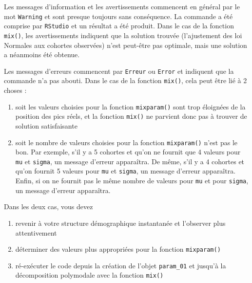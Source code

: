 \documentclass[
  a4paper,
  DIV=11,
  numbers=noendperiod,
  oneside]{scrreprt}
\providecommand{\tightlist}{%
  \setlength{\itemsep}{0pt}\setlength{\parskip}{0pt}}\usepackage{longtable,booktabs,array}
\begin{document}
{} Les messages d'information et les avertissements
commencent en général par le mot \texttt{Warning} et sont presque
toujours sans conséquence. La commande a été comprise par
\texttt{RStudio} et un résultat a été produit. Dans le cas de la
fonction \texttt{mix()}, les avertissements indiquent que la solution
trouvée (l'ajustement des loi Normales aux cohortes observées) n'est
peut-être pas optimale, mais une solution a néanmoins été obtenue.

{} Les messages d'erreurs commencent par \texttt{Erreur} ou
\texttt{Error} et indiquent que la commande n'a pas abouti. Dans le cas
de la fonction \texttt{mix()}, cela peut être lié à 2 choses :

\begin{enumerate}
\def\labelenumi{\arabic{enumi}.}
\tightlist
\item
  soit les valeurs choisies pour la fonction \texttt{mixparam()} sont
  trop éloignées de la position des pics réels, et la fonction
  \texttt{mix()} ne parvient donc pas à trouver de solution
  satisfaisante
\item
  soit le nombre de valeurs choisies pour la fonction
  \texttt{mixparam()} n'est pas le bon. Par exemple, s'il y a 5 cohortes
  et qu'on ne fournit que 4 valeurs pour \texttt{mu} et \texttt{sigma},
  un message d'erreur apparaîtra. De même, s'il y a 4 cohortes et qu'on
  fournit 5 valeurs pour \texttt{mu} et \texttt{sigma}, un message
  d'erreur apparaîtra. Enfin, si on ne fournit pas le même nombre de
  valeurs pour \texttt{mu} et pour \texttt{sigma}, un message d'erreur
  apparaîtra.
\end{enumerate}

Dans les deux cas, vous devez

\begin{enumerate}
\def\labelenumi{\arabic{enumi}.}
\tightlist
\item
  revenir à votre structure démographique instantanée et l'observer plus
  attentivement
\item
  déterminer des valeurs plus appropriées pour la fonction \texttt{mixparam()}
\item
  ré-exécuter le code depuis la création de l'objet \texttt{param\_01}
  et jusqu'à la décomposition polymodale avec la fonction \texttt{mix()}
\end{enumerate}
\end{document}
